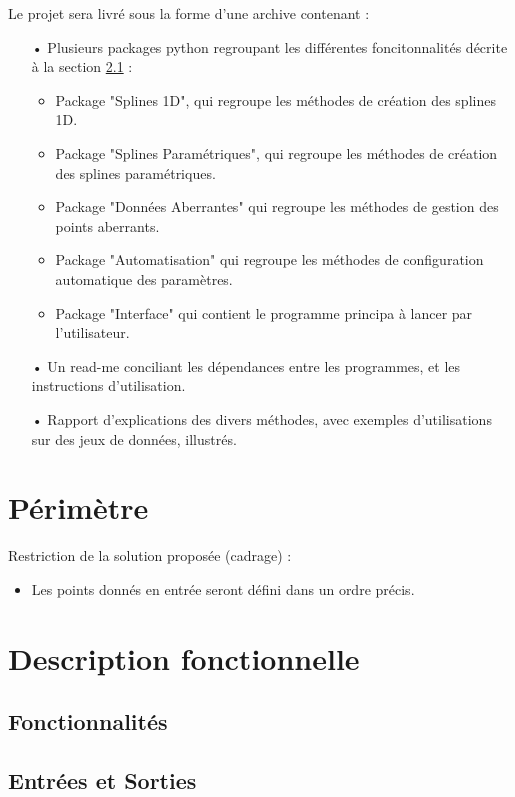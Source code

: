 \documentclass[a4paper,12pt]{article}
\begin{document}
Le projet sera livré sous la forme d'une archive contenant :
\begin{itemize}
\item[•] Plusieurs packages python regroupant les différentes foncitonnalités décrite à la section \ref{Fonctions}  : 
\begin{itemize}
\item Package "Splines 1D", qui regroupe les méthodes de création des splines 1D.
\item Package "Splines Paramétriques", qui regroupe les méthodes de création des splines paramétriques.
\item Package "Données Aberrantes" qui regroupe les méthodes de gestion des points aberrants.
\item Package "Automatisation" qui regroupe les méthodes de configuration automatique des paramètres.
\item Package "Interface" qui contient le programme principa à lancer par l'utilisateur.
\end{itemize}
\item[•] Un read-me conciliant les dépendances entre les programmes, et les instructions d'utilisation.
\item[•] Rapport d'explications des divers méthodes, avec exemples d’utilisations sur des jeux de données, illustrés.
\end{itemize}

\newpage
\section{Périmètre}

Restriction de la solution proposée (cadrage) :
\begin{itemize}
\item Les points donnés en entrée seront défini dans un ordre précis.
\end{itemize}

\newpage
\section{Description fonctionnelle}

\subsection{Fonctionnalités}
\label{Fonctions}


\subsection{Entrées et Sorties}
\end{document}
